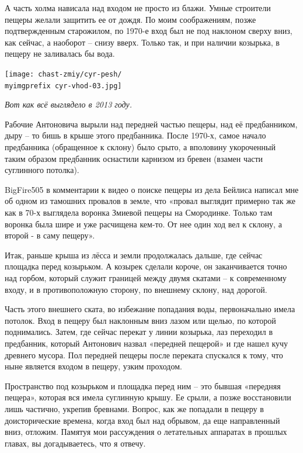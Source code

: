 А часть холма нависала над входом не просто из блажи. Умные строители пещеры желали защитить ее от дождя. По моим соображениям, позже подтвержденным старожилом, по 1970-е вход был не под наклоном сверху вниз, как сейчас, а наоборот – снизу вверх. Только так, и при наличии козырька, в пещеру не заливалась бы вода. 

\begin{center}
\texttt{[image: chast-zmiy/cyr-pesh/\\myimgprefix cyr-vhod-03.jpg]}

\textit{Вот как всё выглядело в 2013 году.}
\end{center}

Рабочие Антоновича вырыли над передней частью пещеры, над её предбанником, дыру – то бишь  в крыше этого предбанника. После 1970-х, самое начало предбанника (обращенное к склону) было срыто, а вполовину укороченный таким образом предбанник оснастили карнизом из бревен (взамен части суглинного потолка).

BigFire505 в комментарии к видео о поиске пещеры из дела Бейлиса написал мне об одном из тамошних провалов в земле, что «провал выглядит примерно так же как в 70-х выглядела воронка Змиевой пещеры на Смородинке. Только там воронка была шире и уже расчищена кем-то. От нее один ход вел к склону, а второй - в саму пещеру».  

Итак, раньше крыша из лёсса и земли продолжалась дальше, где сейчас площадка перед козырьком. А козырек сделали короче, он заканчивается точно над горбом, который служит границей между двумя скатами – к современному входу, и в противоположную сторону, по внешнему склону, над дорогой.

Часть этого внешнего ската, во избежание попадания воды, первоначально имела потолок. Вход в пещеру был наклонным вниз лазом или щелью, по которой поднимались. Затем, где сейчас перекат у линии козырька, лаз переходил в предбанник, который Антонович назвал «передней пещерой» и где нашел кучу древнего мусора. Пол передней пещеры после переката спускался к тому, что ныне является входом в пещеру, узким проходом.

Пространство под козырьком и площадка перед ним – это бывшая «передняя пещера», которая вся имела суглинную крышу. Ее срыли, а позже восстановили лишь частично, укрепив бревнами. Вопрос, как же попадали в пещеру в доисторические времена, когда вход был над обрывом, да еще направленный вниз, отложим. Памятуя мои рассуждения о летательных аппаратах в прошлых главах, вы догадываетесь, что я отвечу.

